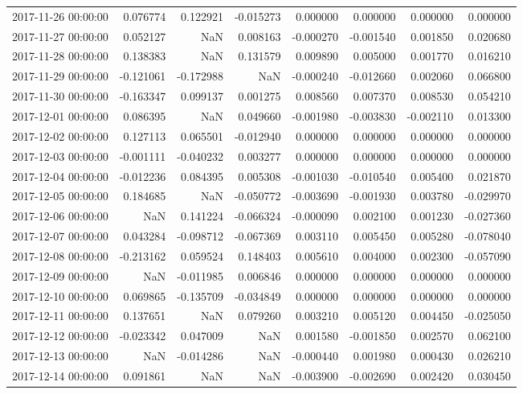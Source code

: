 \begin{tabular}{lrrrrrrr}
2017-11-26 00:00:00 & 0.076774 & 0.122921 & -0.015273 & 0.000000 & 0.000000 & 0.000000 & 0.000000 \\
2017-11-27 00:00:00 & 0.052127 & NaN & 0.008163 & -0.000270 & -0.001540 & 0.001850 & 0.020680 \\
2017-11-28 00:00:00 & 0.138383 & NaN & 0.131579 & 0.009890 & 0.005000 & 0.001770 & 0.016210 \\
2017-11-29 00:00:00 & -0.121061 & -0.172988 & NaN & -0.000240 & -0.012660 & 0.002060 & 0.066800 \\
2017-11-30 00:00:00 & -0.163347 & 0.099137 & 0.001275 & 0.008560 & 0.007370 & 0.008530 & 0.054210 \\
2017-12-01 00:00:00 & 0.086395 & NaN & 0.049660 & -0.001980 & -0.003830 & -0.002110 & 0.013300 \\
2017-12-02 00:00:00 & 0.127113 & 0.065501 & -0.012940 & 0.000000 & 0.000000 & 0.000000 & 0.000000 \\
2017-12-03 00:00:00 & -0.001111 & -0.040232 & 0.003277 & 0.000000 & 0.000000 & 0.000000 & 0.000000 \\
2017-12-04 00:00:00 & -0.012236 & 0.084395 & 0.005308 & -0.001030 & -0.010540 & 0.005400 & 0.021870 \\
2017-12-05 00:00:00 & 0.184685 & NaN & -0.050772 & -0.003690 & -0.001930 & 0.003780 & -0.029970 \\
2017-12-06 00:00:00 & NaN & 0.141224 & -0.066324 & -0.000090 & 0.002100 & 0.001230 & -0.027360 \\
2017-12-07 00:00:00 & 0.043284 & -0.098712 & -0.067369 & 0.003110 & 0.005450 & 0.005280 & -0.078040 \\
2017-12-08 00:00:00 & -0.213162 & 0.059524 & 0.148403 & 0.005610 & 0.004000 & 0.002300 & -0.057090 \\
2017-12-09 00:00:00 & NaN & -0.011985 & 0.006846 & 0.000000 & 0.000000 & 0.000000 & 0.000000 \\
2017-12-10 00:00:00 & 0.069865 & -0.135709 & -0.034849 & 0.000000 & 0.000000 & 0.000000 & 0.000000 \\
2017-12-11 00:00:00 & 0.137651 & NaN & 0.079260 & 0.003210 & 0.005120 & 0.004450 & -0.025050 \\
2017-12-12 00:00:00 & -0.023342 & 0.047009 & NaN & 0.001580 & -0.001850 & 0.002570 & 0.062100 \\
2017-12-13 00:00:00 & NaN & -0.014286 & NaN & -0.000440 & 0.001980 & 0.000430 & 0.026210 \\
2017-12-14 00:00:00 & 0.091861 & NaN & NaN & -0.003900 & -0.002690 & 0.002420 & 0.030450 \\

\end{tabular}
